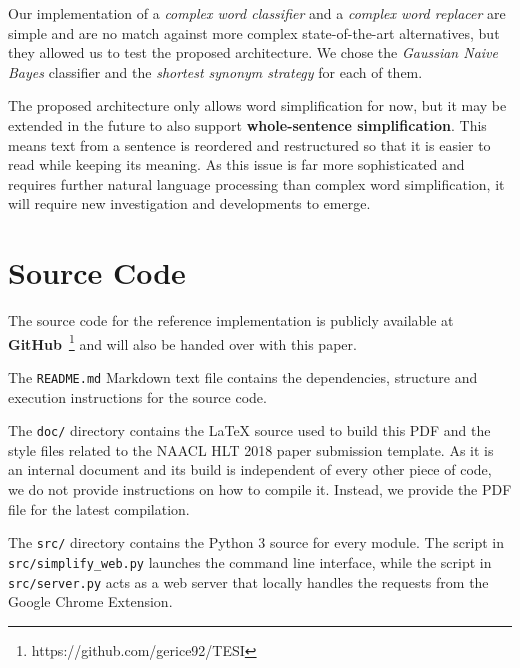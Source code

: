 \documentclass[11pt,a4paper]{article}
\begin{document}
Our implementation of a \emph{complex word classifier} and a \emph{complex word replacer} are simple and are no match against more complex state-of-the-art alternatives, but they allowed us to test the proposed architecture. We chose the \emph{Gaussian Naive Bayes} classifier and the \emph{shortest synonym strategy} for each of them.

The proposed architecture only allows word simplification for now, but it may be extended in the future to also support \textbf{whole-sentence simplification}. This means text from a sentence is reordered and restructured so that it is easier to read while keeping its meaning. As this issue is far more sophisticated and requires further natural language processing than complex word simplification, it will require new investigation and developments to emerge.




\appendix

\section{Source Code}
\label{sec:src}

The source code for the reference implementation is publicly available at \textbf{GitHub}~\footnote{https://github.com/gerice92/TESI} and will also be handed over with this paper.

The \verb|README.md| Markdown text file contains the dependencies, structure and execution instructions for the source code.

The \verb|doc/| directory contains the \LaTeX{} source used to build this PDF and the style files related to the NAACL HLT 2018 paper submission template. As it is an internal document and its build is independent of every other piece of code, we do not provide instructions on how to compile it. Instead, we provide the PDF file for the latest compilation.

The \verb|src/| directory contains the Python 3 source for every module. The script in \verb|src/simplify_web.py| launches the command line interface, while the script in \verb|src/server.py| acts as a web server that locally handles the requests from the Google Chrome Extension.
\end{document}
